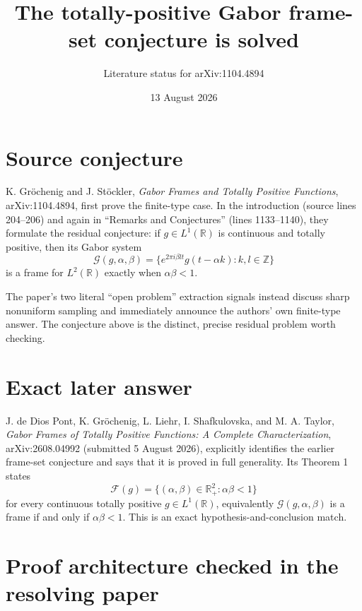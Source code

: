 \documentclass[11pt]{article}
\title{The totally-positive Gabor frame-set conjecture is solved}
\author{Literature status for arXiv:1104.4894}
\date{13 August 2026}
\newcommand{\R}{\mathbb R}
\newcommand{\Z}{\mathbb Z}
\begin{document}
\maketitle

\begin{center}
\end{center}

\section*{Source conjecture}

K. Gr\"ochenig and J. St\"ockler, \emph{Gabor Frames and Totally Positive
Functions}, arXiv:1104.4894, first prove the finite-type case.  In the
introduction (source lines 204--206) and again in ``Remarks and Conjectures''
(lines 1133--1140), they formulate the residual conjecture: if
$g\in L^1(\R)$ is continuous and totally positive, then its Gabor system
\[
 \mathcal G(g,\alpha,\beta)
 =\{e^{2\pi i\beta l t}g(t-\alpha k):k,l\in\Z\}
\]
is a frame for $L^2(\R)$ exactly when $\alpha\beta<1$.

The paper's two literal ``open problem'' extraction signals instead discuss
sharp nonuniform sampling and immediately announce the authors' own
finite-type answer.  The conjecture above is the distinct, precise residual
problem worth checking.

\section*{Exact later answer}

J. de Dios Pont, K. Gr\"ochenig, L. Liehr, I. Shafkulovska, and
M. A. Taylor, \emph{Gabor Frames of Totally Positive Functions: A Complete
Characterization}, arXiv:2608.04992 (submitted 5 August 2026), explicitly
identifies the earlier frame-set conjecture and says that it is proved in
full generality.  Its Theorem 1 states
\[
 \mathcal F(g)=\{(\alpha,\beta)\in\R_+^2:\alpha\beta<1\}
\]
for every continuous totally positive $g\in L^1(\R)$, equivalently
$\mathcal G(g,\alpha,\beta)$ is a frame if and only if
$\alpha\beta<1$.  This is an exact hypothesis-and-conclusion match.

\section*{Proof architecture checked in the resolving paper}
\end{document}
